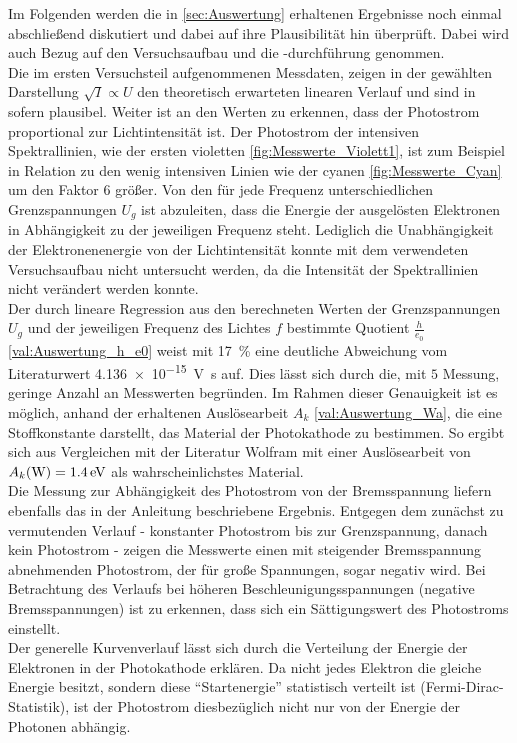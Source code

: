 Im Folgenden werden die in \cref{sec:Auswertung} erhaltenen Ergebnisse
noch einmal abschließend diskutiert und dabei auf ihre Plausibilität hin überprüft.
Dabei wird auch Bezug auf den Versuchsaufbau und die -durchführung genommen.\\

Die im ersten Versuchsteil aufgenommenen Messdaten, zeigen in der 
gewählten Darstellung $\sqrt{I} \propto U$ den theoretisch erwarteten 
linearen Verlauf und sind in sofern plausibel. Weiter ist
an den Werten zu erkennen, dass der Photostrom proportional zur Lichtintensität ist.
Der Photostrom der intensiven Spektrallinien, wie der ersten violetten
\cref{fig:Messwerte_Violett1}, ist zum Beispiel in Relation zu den wenig intensiven 
Linien wie der cyanen \cref{fig:Messwerte_Cyan} um den Faktor $6$ größer.
Von den für jede Frequenz unterschiedlichen Grenzspannungen $U_{g}$ ist 
abzuleiten, dass die Energie der ausgelösten Elektronen in Abhängigkeit zu der 
jeweiligen Frequenz steht. Lediglich die Unabhängigkeit der Elektronenenergie von der 
Lichtintensität konnte mit dem verwendeten Versuchsaufbau nicht untersucht werden,
da die Intensität der Spektrallinien nicht verändert werden konnte.\\

Der durch lineare Regression aus den berechneten Werten der Grenzspannungen 
$U_{g}$ und der jeweiligen Frequenz des Lichtes $f$ bestimmte Quotient
$\tfrac{h}{e_{0}}$\cref{val:Auswertung_h_e0} weist mit \SI{17}{\percent} eine
deutliche Abweichung vom Literaturwert \SI{4.136e-15}{\volt\second}\cite{SciPy} auf.
Dies lässt sich durch die, mit $5$ Messung, geringe Anzahl an Messwerten
begründen.
Im Rahmen dieser Genauigkeit ist es möglich, anhand der erhaltenen Auslösearbeit
$A_{k}$ \cref{val:Auswertung_Wa}, die eine Stoffkonstante darstellt, das Material 
der Photokathode zu bestimmen. So ergibt sich aus Vergleichen mit der Literatur 
\cite{Mende09} Wolfram mit einer Auslösearbeit von $A_{k}(\ce{W}) = \SI{1.4}{\eV}$
als wahrscheinlichstes Material.\\

Die Messung zur Abhängigkeit des Photostrom von der Bremsspannung liefern
ebenfalls das in der Anleitung \cite{V500} beschriebene Ergebnis.
Entgegen dem zunächst zu vermutenden Verlauf - konstanter Photostrom bis zur
Grenzspannung, danach kein Photostrom - zeigen die Messwerte einen mit steigender 
Bremsspannung abnehmenden Photostrom, der für große Spannungen, sogar negativ
wird. Bei Betrachtung des Verlaufs bei höheren Beschleunigungsspannungen 
(negative Bremsspannungen) ist zu erkennen, dass sich ein Sättigungswert 
des Photostroms einstellt. \\
Der generelle Kurvenverlauf lässt sich durch die Verteilung der 
Energie der Elektronen in der Photokathode erklären. Da nicht jedes 
Elektron die gleiche Energie besitzt, sondern diese \enquote{Startenergie}
statistisch verteilt ist (Fermi-Dirac-Statistik), ist der Photostrom diesbezüglich 
nicht nur von der Energie der Photonen abhängig. 

